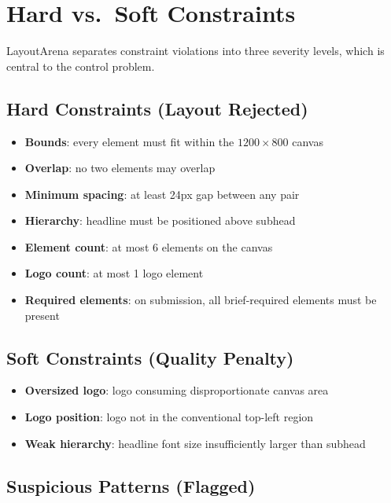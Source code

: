 \documentclass[10pt,twocolumn]{article}
\begin{document}
\section{Hard vs.\ Soft Constraints}

LayoutArena separates constraint violations into three severity levels, which is central to the control problem.

\subsection{Hard Constraints (Layout Rejected)}

\begin{itemize}[leftmargin=*,itemsep=1pt]
    \item \textbf{Bounds}: every element must fit within the $1200 \times 800$ canvas
    \item \textbf{Overlap}: no two elements may overlap
    \item \textbf{Minimum spacing}: at least 24px gap between any pair
    \item \textbf{Hierarchy}: headline must be positioned above subhead
    \item \textbf{Element count}: at most 6 elements on the canvas
    \item \textbf{Logo count}: at most 1 logo element
    \item \textbf{Required elements}: on submission, all brief-required elements must be present
\end{itemize}

\subsection{Soft Constraints (Quality Penalty)}

\begin{itemize}[leftmargin=*,itemsep=1pt]
    \item \textbf{Oversized logo}: logo consuming disproportionate canvas area
    \item \textbf{Logo position}: logo not in the conventional top-left region
    \item \textbf{Weak hierarchy}: headline font size insufficiently larger than subhead
\end{itemize}

\subsection{Suspicious Patterns (Flagged)}
\end{document}
